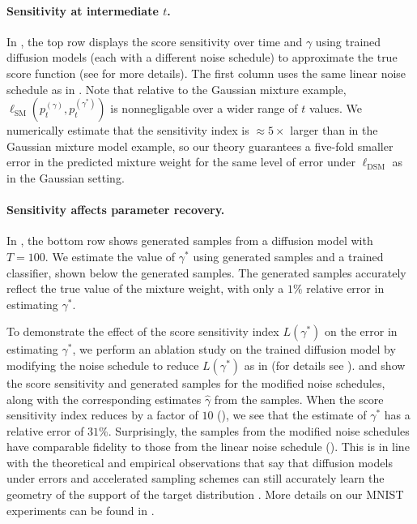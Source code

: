 \documentclass[11pt]{article}
\theoremstyle{plain}
\newcommand{\1}{\mathbbm{1}}
\newcommand{\ldsm}{\ell_\mathrm{DSM}}
\newcommand{\lsm}{\ell_\mathrm{SM}}
\newcommand{\pdist}[2][]{p_{#1}^{(#2)}}
\begin{document}
\paragraph{Sensitivity at intermediate $t$.} In , the top row displays the score sensitivity over time and $\gamma$ using trained diffusion models (each with a different noise schedule) to approximate the true score function (see  for more details). The first column uses the same linear noise schedule as in . Note that relative to the Gaussian mixture example, $\lsm(\pdist[t]{\gamma}, \pdist[t]{\gamma^*})$ is nonnegligable over a wider range of $t$ values.  
We numerically estimate that the sensitivity index is $\approx 5\times$ larger than in the Gaussian mixture model example, so our theory guarantees a five-fold smaller error in the predicted mixture weight for the same level of error under $\ldsm$ as in the Gaussian setting.

\paragraph{Sensitivity affects parameter recovery.} 
In , the bottom row shows generated samples from a diffusion model with $T=100$. We estimate the value of $\gamma^*$ using generated samples and a trained classifier, shown below the generated samples. The generated samples accurately reflect the true value of the mixture weight, with only a $1\%$ relative error in estimating $\gamma^*$. 

To demonstrate the effect of the score sensitivity index $L(\gamma^*)$ on the error in estimating $\gamma^*$, we perform an ablation study on the trained diffusion model by modifying the noise schedule to reduce $L(\gamma^*)$ as in  (for details see ).  and  show the score sensitivity and generated samples for the modified noise schedules, along with the corresponding estimates $\hat\gamma$ from the samples. When the score sensitivity index reduces by a factor of $10$ (), we see that the estimate of $\gamma^*$ has a relative error of $31\%$. 
Surprisingly, the samples from the modified noise schedules have comparable fidelity to those from the linear noise schedule (). This is in line with the theoretical and empirical observations that say that diffusion models under errors and accelerated sampling schemes can still accurately learn the geometry of the support of the target distribution \citep{songddim2021, nichol2021improveddenoisingdiffusionprobabilistic, stanczuk2022your,chandramoorthy2026when}. More details on our MNIST experiments can be found in . 
\end{document}
